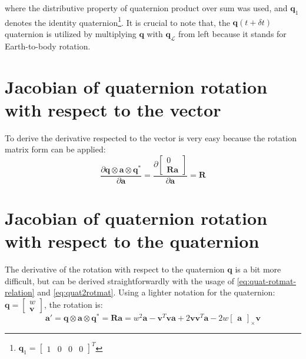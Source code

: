 where the distributive property of quaternion product over sum was used, and $\mathbf{q}_1$ denotes the identity quaternion\footnote{$\mathbf{q}_1=\begin{bmatrix} 1 & 0 & 0 & 0 \end{bmatrix}^T$}. It is crucial to note that, the $\mathbf{q}(t+\delta t)$ quaternion is utilized by multiplying $\mathbf{q}$ with $\mathbf{q}_\mathcal{L}$ from left because it stands for Earth-to-body rotation.

\section{Jacobian of quaternion rotation with respect to the vector}
\label{app:der-rot-by-vec}

To derive the derivative respected to the vector is very easy because the rotation matrix form can be applied:
\begin{equation}
    \frac{\partial\mathbf{q}\otimes\mathbf{a}\otimes\mathbf{q}^*}{\partial\mathbf{a}}=\frac{\partial\begin{bmatrix}
        0 \\ \mathbf{R}\mathbf{a}
    \end{bmatrix}}{\partial \mathbf{a}}=\mathbf{R}
\end{equation}

\section{Jacobian of quaternion rotation with respect to the quaternion}
\label{app:der-rot-by-quat}

The derivative of the rotation with respect to the quaternion $\mathbf{q}$ is a bit more difficult, but can be derived straightforwardly with the usage of \eqref{eq:quat-rotmat-relation} and \eqref{eq:quat2rotmat}. Using a lighter notation for the quaternion: $\mathbf{q}=\begin{bmatrix} w \\ \mathbf{v} \end{bmatrix}$, the rotation is:
\begin{equation}
    \mathbf{a}'=\mathbf{q}\otimes\mathbf{a}\otimes\mathbf{q}^*=\mathbf{R}\mathbf{a}=w^2\mathbf{a}-\mathbf{v}^T\mathbf{v}\mathbf{a}+2\mathbf{v}\mathbf{v}^T\mathbf{a}-2w\begin{bmatrix}
        \mathbf{a}
    \end{bmatrix}_\times \mathbf{v}
\end{equation}

